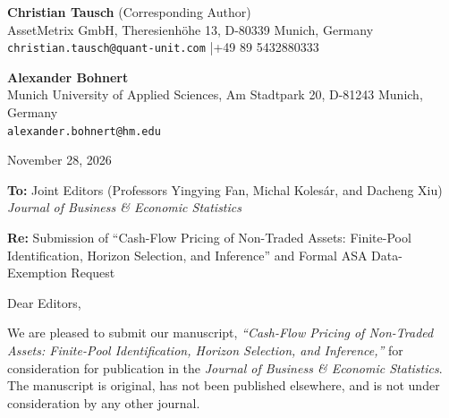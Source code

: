 \documentclass[11pt]{article}
\begin{document}
\thispagestyle{empty}

\noindent\textbf{Christian Tausch} (Corresponding Author) \\
AssetMetrix GmbH, Theresienh\"{o}he 13, D-80339 Munich, Germany \\
\texttt{christian.tausch@quant-unit.com} \quad|\quad +49 89 5432880333

\medskip
\noindent\textbf{Alexander Bohnert} \\
Munich University of Applied Sciences, Am Stadtpark 20, D-81243 Munich, Germany \\
\texttt{alexander.bohnert@hm.edu}

\medskip
\noindent November 28, 2026

\medskip
\noindent\textbf{To:} Joint Editors (Professors Yingying Fan, Michal Koles\'{a}r, and Dacheng Xiu) \\
\emph{Journal of Business \& Economic Statistics}

\medskip
\noindent\textbf{Re:} Submission of ``Cash-Flow Pricing of Non-Traded Assets: Finite-Pool Identification, Horizon Selection, and Inference'' and Formal ASA Data-Exemption Request

\medskip
\noindent Dear Editors,

We are pleased to submit our manuscript, \emph{``Cash-Flow Pricing of Non-Traded Assets: Finite-Pool Identification, Horizon Selection, and Inference,''} for consideration for publication in the \emph{Journal of Business \& Economic Statistics}. The manuscript is original, has not been published elsewhere, and is not under consideration by any other journal.
\end{document}
